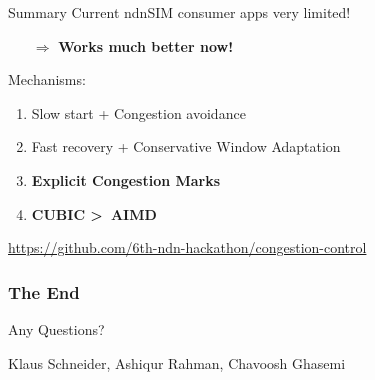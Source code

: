 \begin{frame}{Summary}
Current ndnSIM consumer apps very limited! 

\begin{itemize}
\item [$\Rightarrow$] \textbf{Works much better now!}
\end{itemize}

\pause
Mechanisms:
\begin{enumerate}
\item Slow start + Congestion avoidance
\pause
\item Fast recovery + Conservative Window Adaptation
\pause
\item \textbf{Explicit Congestion Marks}
\pause
\item \textbf{CUBIC \textgreater\ AIMD}
\end{enumerate}

\pause
{\footnotesize
\url{https://github.com/6th-ndn-hackathon/congestion-control}
}

\end{frame}





\begin{frame}
	\frametitle{The End}
	\vspace{2cm}
	{\huge Any Questions?
	}
	\vspace{2.5cm}  
	\begin{flushright}  
		Klaus Schneider, Ashiqur Rahman, Chavoosh Ghasemi \\
	\end{flushright}
\end{frame}
